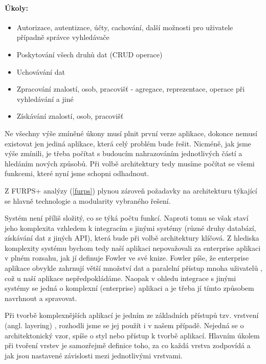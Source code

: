 \paragraph{Úkoly:}
\begin{itemize}
    \item Autorizace, autentizace, účty, cachování, další možnosti pro uživatele případně správce vyhledávače
    \item Poskytování všech druhů dat (CRUD operace)
    \item Uchovávání dat
    \item Zpracování znalostí, osob, pracovišť - agregace, reprezentace, operace při vyhledávání a jiné
    \item Získávání znalostí, osob, pracovišť
\end{itemize}
Ne všechny výše zmíněné úkony musí plnit první verze aplikace, dokonce nemusí existovat jen jediná aplikace, která celý problém bude řešit. Nicméně, jak jsme výše zmínili, je třeba počítat s budoucím nahrazováním jednotlivých částí a hledáním nových způsobů. Při volbě architektury tedy musíme počítat se všemi funkcemi, které nyní jsme schopni odhadnout.\par
Z FURPS+ analýzy (\ref{furps}) plynou zároveň požadavky na architekturu týkající se hlavně technologie a modularity vybraného řešení.\par
Systém není příliš složitý, co se týká počtu funkcí. Naproti tomu se však staví jeho komplexita vzhledem k integracím s jinými systémy (různé druhy databází, získávání dat z jiných API), která bude při volbě architektury klíčová. Z hlediska komplexity systému bychom tedy naší aplikaci nepovažovali za enterprise aplikaci v plném rozsahu, jak jí definuje Fowler ve své knize. Fowler píše, že enterprise aplikace obvykle zahrnují větší množství dat a paralelní přístup mnoha uživatelů  \cite{fowler-patterns}, což u naší aplikace nepředpokládáme. Naopak v ohledu integrace s jinými systémy se jedná o komplexní (enterprise) aplikaci a je třeba jí tímto způsobem navrhnout a spravovat.\par
Při tvorbě komplexnějších aplikací je jedním ze základních přístupů tzv. vrstvení (angl. layering) \cite{fowler-patterns}, rozhodli jsme se jej použít i v našem případě. Nejedná se o architektonický vzor, spíše o styl nebo přístup k tvorbě aplikací. Hlavním úkolem při tvoření vrstev je samozřejmě definice toho, za co každá vrstva zodpovídá \cite{fowler-patterns} a jak jsou nastavené závislosti mezi jednotlivými vrstvami.\par
